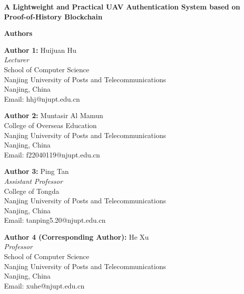 \documentclass[12pt]{article}
\begin{document}
\pagestyle{empty}

\begin{center}

{\LARGE\bfseries A Lightweight and Practical UAV Authentication System based on Proof-of-History Blockchain}

\vspace{2cm}

{\Large\bfseries Authors}

\vspace{1.5cm}

{\large
\textbf{Author 1:} Huijuan Hu\\
\textit{Lecturer}\\
School of Computer Science\\
Nanjing University of Posts and Telecommunications\\
Nanjing, China\\
Email: hhj@njupt.edu.cn\\
}

\vspace{1cm}

{\large
\textbf{Author 2:} Muntasir Al Mamun\\
College of Overseas Education\\
Nanjing University of Posts and Telecommunications\\
Nanjing, China\\
Email: f22040119@njupt.edu.cn\\
}

\vspace{1cm}

{\large
\textbf{Author 3:} Ping Tan\\
\textit{Assistant Professor}\\
College of Tongda\\
Nanjing University of Posts and Telecommunications\\
Nanjing, China\\
Email: tanping5.20@njupt.edu.cn\\
}

\vspace{1cm}

{\large
\textbf{Author 4 (Corresponding Author):} He Xu\\
\textit{Professor}\\
School of Computer Science\\
Nanjing University of Posts and Telecommunications\\
Nanjing, China\\
Email: xuhe@njupt.edu.cn\\
}


\end{center}
\end{document}
